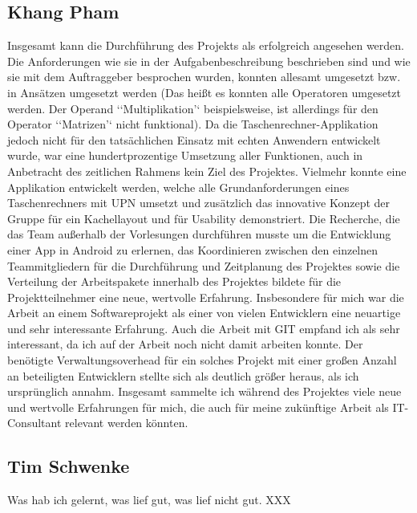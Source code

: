 \subsection{Khang Pham}
Insgesamt kann die Durchführung des Projekts als erfolgreich angesehen werden. Die Anforderungen wie sie in der Aufgabenbeschreibung beschrieben sind und wie sie mit dem Auftraggeber besprochen wurden, konnten allesamt umgesetzt bzw. in Ansätzen umgesetzt werden (Das heißt es konnten alle Operatoren umgesetzt werden. Der Operand ‘‘Multiplikation’‘ beispielsweise, ist allerdings für den Operator ‘‘Matrizen’‘ nicht funktional). Da die Taschenrechner-Applikation jedoch nicht für den tatsächlichen Einsatz mit echten Anwendern entwickelt wurde, war eine hundertprozentige Umsetzung aller Funktionen, auch in Anbetracht des zeitlichen Rahmens kein Ziel des Projektes. Vielmehr konnte eine Applikation entwickelt werden, welche alle Grundanforderungen eines Taschenrechners mit UPN umsetzt und zusätzlich das innovative Konzept der Gruppe für ein Kachellayout und für Usability demonstriert. Die Recherche, die das Team außerhalb der Vorlesungen durchführen musste um die Entwicklung einer App in Android zu erlernen, das Koordinieren zwischen den einzelnen Teammitgliedern für die Durchführung und Zeitplanung des Projektes sowie die Verteilung der Arbeitspakete innerhalb des Projektes bildete für die Projektteilnehmer eine neue, wertvolle Erfahrung.
Insbesondere für mich war die Arbeit an einem Softwareprojekt als einer von vielen Entwicklern eine neuartige und sehr interessante Erfahrung. Auch die Arbeit mit GIT empfand ich als sehr interessant, da ich auf der Arbeit noch nicht damit arbeiten konnte. Der benötigte Verwaltungsoverhead für ein solches Projekt mit einer großen Anzahl an beteiligten Entwicklern stellte sich als deutlich größer heraus, als ich ursprünglich annahm. Insgesamt sammelte ich während des Projektes viele neue und wertvolle Erfahrungen für mich, die auch für meine zukünftige Arbeit als IT-Consultant relevant werden könnten. 

\subsection{Tim Schwenke}
Was hab ich gelernt, was lief gut, was lief nicht gut.
XXX

